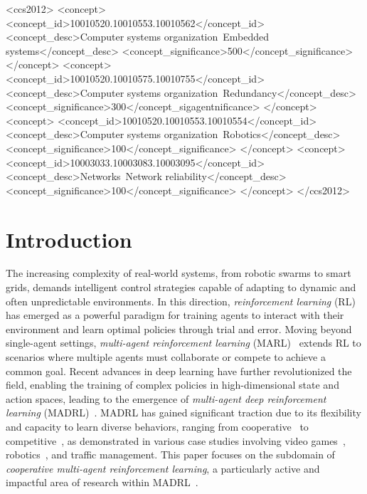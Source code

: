 \documentclass[sigconf]{acmart}
\begin{document}
%
\begin{CCSXML}
<ccs2012>
 <concept>
  <concept_id>10010520.10010553.10010562</concept_id>
  <concept_desc>Computer systems organization~Embedded systems</concept_desc>
  <concept_significance>500</concept_significance>
 </concept>
 <concept>
  <concept_id>10010520.10010575.10010755</concept_id>
  <concept_desc>Computer systems organization~Redundancy</concept_desc>
  <concept_significance>300</concept_sigagentnificance>
 </concept>
 <concept>
  <concept_id>10010520.10010553.10010554</concept_id>
  <concept_desc>Computer systems organization~Robotics</concept_desc>
  <concept_significance>100</concept_significance>
 </concept>
 <concept>
  <concept_id>10003033.10003083.10003095</concept_id>
  <concept_desc>Networks~Network reliability</concept_desc>
  <concept_significance>100</concept_significance>
 </concept>
</ccs2012>  
\end{CCSXML}



\maketitle

\section{Introduction}
The increasing complexity of real-world systems, from robotic swarms to smart grids, demands intelligent control strategies capable of adapting to dynamic and often unpredictable environments.
%
In this direction, \emph{reinforcement learning} (RL)~\cite{sutton2018reinforcement} has emerged as a powerful paradigm for training agents to interact with their environment and learn optimal policies through trial and error.
%
Moving beyond single-agent settings, \emph{multi-agent reinforcement learning} (MARL)~\cite{bucsoniu2010multi} extends RL to scenarios where multiple agents must collaborate or compete to achieve a common goal.
%
Recent advances in deep learning have further revolutionized the field, 
enabling the training of complex policies in high-dimensional state and action spaces, 
leading to the emergence of \emph{multi-agent deep reinforcement learning} (MADRL)~\cite{gronauer2022multi}.
%
MADRL has gained significant traction due to its flexibility and capacity to learn diverse behaviors, 
ranging from cooperative~\cite{gupta2017cooperative} to competitive~\cite{tampuu2017multiagent}, 
as demonstrated in various case studies involving video games~\cite{shao2019survey}, robotics~\cite{orr2023multi},
and traffic management. 
%
This paper focuses on the subdomain of \emph{cooperative multi-agent reinforcement learning}, 
a particularly active and impactful area of research within MADRL~\cite{oroojlooy2023review}.
\end{document}
